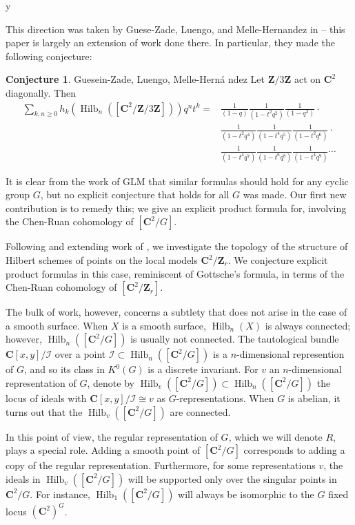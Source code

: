 y\documentclass{amsart}[12pt]
\theoremstyle{definition}
\newtheorem{conjecture}[dummy]{Conjecture}
\newcommand{\Z}{\mathbf{Z}}
\newcommand{\C}{\mathbf{C}}
\DeclareMathOperator{\Hilb}{Hilb}
\begin{document}
This direction was taken by Guese-Zade, Luengo, and Melle-Hernandez in \cite{GLM} -- this paper is largely an extension of work done there.  In particular, they made the following conjecture:

\begin{conjecture}{Guesein-Zade, Luengo, Melle-Hern\'a ndez}
Let $\Z/3\Z$ act on $\C^2$ diagonally.  Then
\begin{equation*}
\begin{split}
\sum_{k, n\geq 0} h_k(\Hilb_n([\C^2/\Z/3\Z]))q^nt^k =&\frac{1}{(1-q)}
\frac{1}{(1-t^2q^2)}\frac{1}{(1-q^3)} \cdot \\
&\frac{1}{(1-t^2q^4)}\frac{1}{(1-t^4q^5)}\frac{1}{(1-t^2q^6)}\cdot \\
&\frac{1}{(1-t^4q^7)}\frac{1}{(1-t^6q^8)}\frac{1}{(1-t^4q^9)}\cdots
\end{split}
\end{equation*}
\end{conjecture}

It is clear from the work of GLM that similar formulas should hold for any cyclic group $G$, but no explicit conjecture that holds for all $G$ was made.  Our first new contribution is to remedy this; we give an explicit product formula for, involving the Chen-Ruan cohomology of $[\C^2/G]$.


Following and extending work of , we investigate the topology of the structure of Hilbert schemes of points on the local models $\C^2/\Z_r$.  We conjecture explicit product formulas in this case, reminiscent of Gottsche's formula, in terms of the Chen-Ruan cohomology of $[\C^2/\Z_r]$.  

The bulk of work, however, concerns a subtlety that does not arise in the case of a smooth surface.  When $X$ is a smooth surface, $\Hilb_n(X)$ is always connected; however, $\Hilb_n([\C^2/G])$ is usually not connected.  The tautological bundle $\C[x,y]/\mathcal{I}$ over a point $\mathcal{I}\subset\Hilb_n([\C^2/G])$ is a $n$-dimensional represention of $G$, and so its class in $K^0(G)$ is a discrete invariant.  For $v$ an $n$-dimensional representation of $G$, denote by $\Hilb_v([\C^2/G])\subset \Hilb_n([\C^2/G])$ the locus of ideals with $\C[x,y]/\mathcal{I}\cong v$ as $G$-representations.  When $G$ is abelian, it turns out that the $\Hilb_v([\C^2/G])$ are connected.  

In this point of view, the regular representation of $G$, which we will denote $R$, plays a special role.  Adding a smooth point of $[\C^2/G]$ corresponds to adding a copy of the regular representation.  Furthermore, for some representations $v$, the ideals in $\Hilb_v([\C^2/G])$ will be supported only over the singular points in $\C^2/G$.  For instance, $\Hilb_1([\C^2/G])$ will always be isomorphic to the $G$ fixed locus $(\C^2)^G$.
\end{document}
